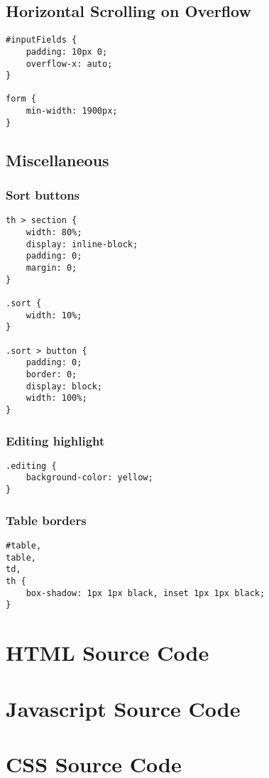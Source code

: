 \documentclass[letterpaper]{article}
\begin{document}
\subsection{Horizontal Scrolling on Overflow}\label{overflow-x}

\begin{lstlisting}[firstnumber=5]
#inputFields {
    padding: 10px 0;
    overflow-x: auto;
}

form {
    min-width: 1900px;
}
\end{lstlisting}

\subsection{Miscellaneous}

\subsubsection{Sort buttons}

\begin{lstlisting}[firstnumber=47]
th > section {
    width: 80%;
    display: inline-block;
    padding: 0;
    margin: 0;
}

.sort {
    width: 10%;
}

.sort > button {
    padding: 0;
    border: 0;
    display: block;
    width: 100%;
}
\end{lstlisting}

\subsubsection{Editing highlight}

\begin{lstlisting}[firstnumber=65]
.editing {
    background-color: yellow;
}
\end{lstlisting}

\subsubsection{Table borders}

\begin{lstlisting}[firstnumber=69]
#table,
table,
td,
th {
    box-shadow: 1px 1px black, inset 1px 1px black;
}
\end{lstlisting}

\newpage

\appendix
\section{HTML Source Code}


\newpage

\section{Javascript Source Code}


\newpage

\section{CSS Source Code}

\end{document}
